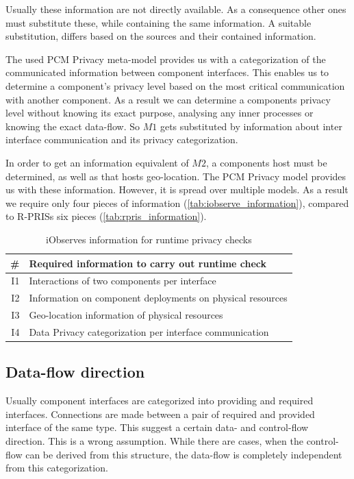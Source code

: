 Usually these information are not directly available. As a consequence other ones must substitute these, while containing the same information. A suitable substitution, differs based on the sources and their contained information.

The used PCM Privacy meta-model provides us with a categorization of the communicated information between component interfaces. This enables us to determine a component's privacy level based on the most critical communication with another component. As a result we can determine a components privacy level without knowing its exact purpose, analysing any inner processes or knowing the exact data-flow. So $M1$ gets substituted by information about inter interface communication and its privacy categorization.

In order to get an information equivalent of $M2$, a components host must be determined, as well as that hosts geo-location. The PCM Privacy model provides us with these information. However, it is spread over multiple models. As a result we require only four pieces of information (\autoref{tab:iobserve_information}), compared to R-PRISs six pieces (\autoref{tab:rpris_information}).

\begin{table}[h]
	\centering
	\begin{tabular}{r | l}
		\hline
		\textbf{\#} & \textbf{Required information to carry out runtime check}\\
		\hline
		I1 & Interactions of two components per interface \\
		I2 & Information on component deployments on physical resources \\
		I3 & Geo-location information of physical resources \\
		I4 & Data Privacy categorization per interface communication \\
		\hline
	\end{tabular}
	\caption{iObserves information for runtime privacy checks}
	\label{tab:iobserve_information}
\end{table}

\subsection{Data-flow direction}
\label{sec:PrivacyAnalysis:theory:dataflow}
Usually component interfaces are categorized into providing and required interfaces. Connections are made between a pair of required and provided interface of the same type. This suggest a certain data- and control-flow direction. This is a wrong assumption. While there are cases, when the control-flow can be derived from this structure, the data-flow is completely independent from this categorization.

